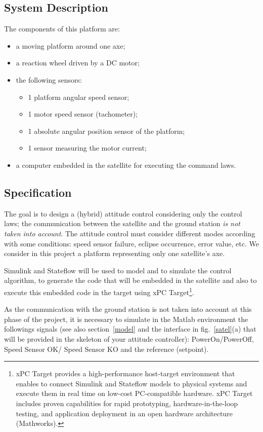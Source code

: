 \documentclass[a4paper]{article}
\begin{document}
\subsection{System Description}

The components of this platform are:
\begin{itemize}
\item a moving platform around one axe;
\item a reaction wheel driven by a DC motor;
\item the following sensors:
	\begin{itemize}
	\item 1 platform angular speed sensor;
	\item 1 motor speed sensor (tachometer);
	\item 1 absolute angular position sensor of the platform;
	\item 1 sensor measuring the motor current;
	\end{itemize}
\item a computer embedded in the satellite for executing the command laws.
\end{itemize}

\subsection{Specification}
\label{spec}

The goal is to design a (hybrid) attitude control considering only the control laws; the
communication between the satellite and the ground station \emph{is not taken into account}.
The attitude control must consider different modes according with some conditions: speed sensor
failure, eclipse occurrence, error value, etc. We consider in this project a platform representing
only one satellite's axe.

Simulink and Stateflow will be used to model and to simulate the control algorithm, 
to generate the code that will be embedded in the satellite and also to execute this 
embedded code in the target using xPC Target\footnote{xPC Target provides a high-performance 
host-target environment that enables to connect Simulink and Stateflow models to physical 
systems and execute them in real time on low-cost PC-compatible hardware. xPC Target 
includes proven capabilities for rapid prototyping, hardware-in-the-loop testing, and 
application deployment in an open hardware architecture (Mathworks).}.

As the communication with the ground station is not taken into account at this phase of 
the project, it is necessary to simulate in the Matlab environment the followings signals 
(see also section~\ref{model} and the interface in fig.~\ref{satel}(a) that will be provided in 
the skeleton of your attitude controller): PowerOn/PowerOff,  Speed Sensor OK/ Speed Sensor KO 
and the reference (setpoint).
\end{document}
